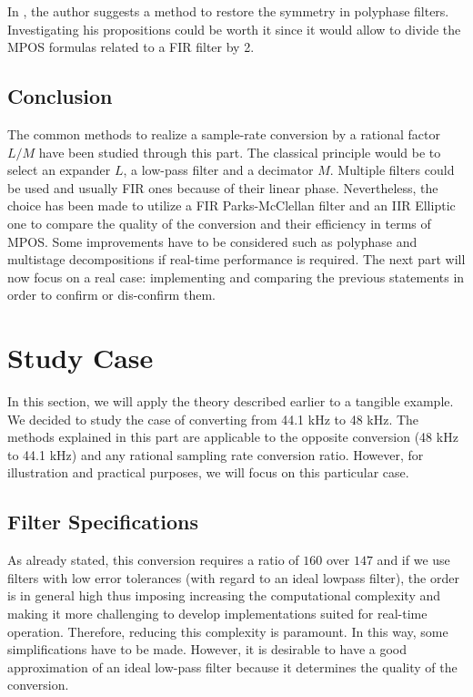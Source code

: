 In \cite{bruekers}, the author suggests a method to restore the symmetry in polyphase filters. Investigating his propositions could be worth it since it would allow to divide the MPOS formulas related to a FIR filter by 2.

\subsection{Conclusion}


The common methods to realize a sample-rate conversion by a rational factor $L/M$ have been studied through this part. The classical principle would be to select an expander $L$, a low-pass filter and a decimator $M$. Multiple filters could be used and usually FIR ones because of their linear phase. Nevertheless, the choice has been made to utilize a FIR Parks-McClellan filter and an IIR Elliptic one to compare the  quality of the conversion and their efficiency in terms of MPOS. Some improvements have to be considered such as polyphase and multistage decompositions if real-time performance is required. The next part will now focus on a real case: implementing and comparing the previous statements  in order to confirm or dis-confirm them. 

\newpage

\section{Study Case}

In this section, we will apply the theory described earlier to a tangible example. We decided to study the case of converting from 44.1 kHz to 48 kHz. The methods explained in this part are applicable to the opposite conversion (48 kHz to 44.1 kHz) and any rational sampling rate conversion ratio. However, for illustration and practical purposes, we will focus on this particular case.

\subsection{Filter Specifications}\label{section 3.2.1}
As already stated, this conversion requires a ratio of $160$ over $147$ and if we use filters with low error tolerances (with regard to an ideal lowpass filter), the order is in general high thus imposing increasing the computational complexity and making it more challenging to develop implementations suited for real-time operation. Therefore, reducing this complexity is paramount. In this way, some simplifications have to be made. However, it is desirable to have a good approximation of an ideal low-pass filter because it determines the quality of the conversion. 

